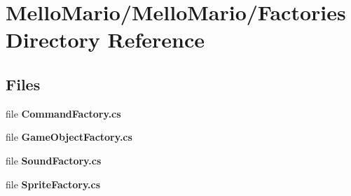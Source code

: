 \section{Mello\+Mario/\+Mello\+Mario/\+Factories Directory Reference}
\label{dir_ea4f3dd52bb0a361d45d97e755e26799}
\subsection*{Files}
\begin{DoxyCompactItemize}
\item 
file \textbf{ Command\+Factory.\+cs}
\item 
file \textbf{ Game\+Object\+Factory.\+cs}
\item 
file \textbf{ Sound\+Factory.\+cs}
\item 
file \textbf{ Sprite\+Factory.\+cs}
\end{DoxyCompactItemize}
